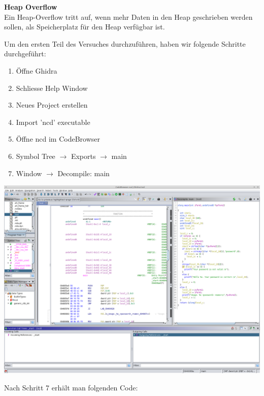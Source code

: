 \documentclass[12pt,a4paper]{article}
\begin{document}
	\textbf{Heap Overflow}\\
	Ein Heap-Overflow tritt auf, wenn mehr Daten in den Heap geschrieben werden sollen, als Speicherplatz für 
	den Heap verfügbar ist.
	\bigskip
	
	Um den ersten Teil des Versuches durchzuführen, haben wir folgende Schritte durchgeführt:
	
	\begin{enumerate}
		\item Öffne Ghidra
		\item Schliesse Help Window
		\item Neues Project erstellen
		\item Import 'ncd' executable
		\item Öffne ncd im CodeBrowser
		\item Symbol Tree $\rightarrow$ Exports $\rightarrow$ main
		\item Window $\rightarrow$ Decompile: main 
	\end{enumerate}
	
	\begin{center}
		\includegraphics[scale=0.3]{ghidra.png}
	\end{center}
	
	Nach Schritt 7 erhält man folgenden Code:\\
	
\end{document}
